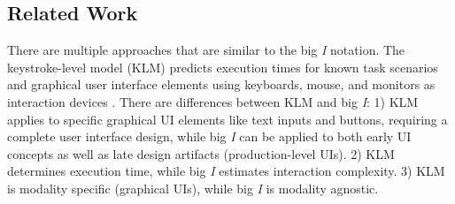 \subsection{Related Work}

There are multiple approaches that are similar to the big \textit{I} notation. The keystroke-level model (KLM) predicts execution times for known task scenarios and graphical user interface elements using keyboards, mouse, and monitors as interaction devices \cite{Card1980-KLM-Article,CardNewellMoran1983-book,Olson1990-KLM-HCI-article}. 
There are differences between KLM and big \textit{I}: 1) KLM applies to specific graphical UI elements like text inputs and buttons, requiring a complete user interface design, while big \textit{I} can be applied to both early UI concepts as well as late design artifacts (production-level UIs). 2) KLM determines execution time, while big \textit{I} estimates interaction complexity. 3) KLM is modality specific (graphical UIs), while big \textit{I} is modality agnostic.

